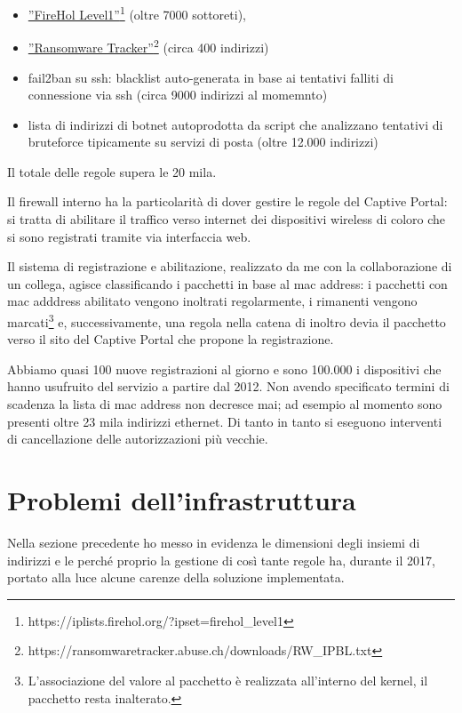 \begin{itemize}
    \item \href{https://iplists.firehol.org/?ipset=firehol\_level1}{''FireHol
    Level1''}\footnote{https://iplists.firehol.org/?ipset=firehol\_level1} (oltre
    7000 sottoreti),
    \item \href{https://ransomwaretracker.abuse.ch/downloads/RW\_IPBL.txt}{''Ransomware
    Tracker''}\footnote{https://ransomwaretracker.abuse.ch/downloads/RW\_IPBL.txt}
    (circa 400 indirizzi)
    \item fail2ban su ssh: blacklist auto-generata in base ai tentativi
    falliti di connessione via ssh (circa 9000 indirizzi al momemnto)
    \item lista di indirizzi di botnet autoprodotta da script che analizzano
    tentativi di bruteforce tipicamente su servizi di posta (oltre 12.000
    indirizzi)
\end{itemize}
Il totale delle regole supera le 20 mila.

Il firewall interno ha la particolarità di dover gestire le regole del 
Captive Portal: si tratta di abilitare il traffico verso internet dei
dispositivi wireless di coloro che si sono registrati tramite via interfaccia
web.

Il sistema di registrazione e abilitazione, realizzato da me con la
collaborazione di un collega, agisce classificando i pacchetti in base al mac
address: i pacchetti con mac adddress abilitato vengono inoltrati
regolarmente, i rimanenti vengono marcati\footnote{L'associazione del valore
al pacchetto è realizzata all'interno del kernel, il pacchetto resta
inalterato.} e, successivamente, una regola nella catena di inoltro devia il
pacchetto verso il sito del Captive Portal che propone la registrazione.

Abbiamo quasi 100 nuove registrazioni al giorno e sono 100.000 i dispositivi
che hanno usufruito del servizio a partire dal 2012.  Non avendo specificato
termini di scadenza la lista di mac address non decresce mai; ad esempio al
momento sono presenti oltre 23 mila indirizzi ethernet.  Di tanto in tanto si
eseguono interventi di cancellazione delle autorizzazioni pi\`u vecchie.

\section{Problemi dell'infrastruttura}

Nella sezione precedente ho messo in evidenza le dimensioni degli insiemi di
indirizzi e le perché proprio la gestione di così tante regole ha, durante il
2017, portato alla luce alcune carenze della soluzione implementata.

